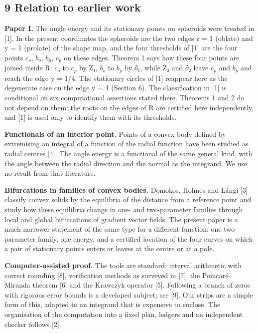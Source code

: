 \documentclass[
  11pt,
]{article}
\begin{document}
\subsection{9 Relation to earlier work}

\textbf{Paper I.} The angle energy and its stationary points on
spheroids were treated in {[}1{]}. In the present coordinates the
spheroids are the two edges z = 1 (oblate) and y = 1 (prolate) of the
shape map, and the four thresholds of {[}1{]} are the four points
\(c_{o}\), \(b_{o}\), \(b_{p}\), \(c_{p}\) on these edges. Theorem 1
says how these four points are joined inside R: \(c_{o}\) to \(c_{p}\)
by Z₁, \(b_{o}\) to \(b_{p}\) by ∂₁, while Z₂ and ∂₂ leave \(c_{p}\) and
\(b_{p}\) and reach the edge y = 1/4. The stationary circles of {[}1{]}
reappear here as the degenerate case on the edge y = 1 (Section 6). The
classification in {[}1{]} is conditional on six computational assertions
stated there. Theorems 1 and 2 do not depend on them: the roots on the
edges of R are certified here independently, and {[}1{]} is used only to
identify them with its thresholds.

\textbf{Functionals of an interior point.} Points of a convex body
defined by extremising an integral of a function of the radial function
have been studied as radial centres {[}4{]}. The angle energy is a
functional of the same general kind, with the angle between the radial
direction and the normal as the integrand. We use no result from that
literature.

\textbf{Bifurcations in families of convex bodies.} Domokos, Holmes and
Lángi {[}3{]} classify convex solids by the equilibria of the distance
from a reference point and study how these equilibria change in one- and
two-parameter families through local and global bifurcations of gradient
vector fields. The present paper is a much narrower statement of the
same type for a different function: one two-parameter family, one
energy, and a certified location of the four curves on which a pair of
stationary points enters or leaves at the centre or at a pole.

\textbf{Computer-assisted proof.} The tools are standard: interval
arithmetic with correct rounding {[}8{]}, verification methods as
surveyed in {[}7{]}, the Poincaré--Miranda theorem {[}6{]} and the
Krawczyk operator {[}5{]}. Following a branch of zeros with rigorous
error bounds is a developed subject; see {[}9{]}. Our strips are a
simple form of this, adapted to an integrand that is expensive to
enclose. The organisation of the computation into a fixed plan, ledgers
and an independent checker follows {[}2{]}.
\end{document}
